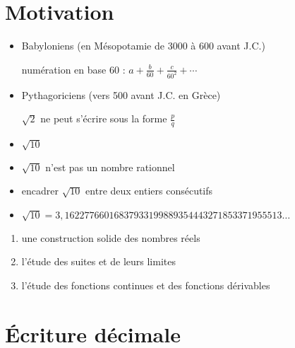 \section*{Motivation}
\begin{frame}


\begin{itemize}
 \item Babyloniens (en Mésopotamie de 3000 à 600 avant J.C.) 
\pause

 numération en base $60$ : $a+\frac{b}{60} + \frac{c}{60^2}+ \cdots$

 \pause
 
 \item Pythagoriciens (vers 500 avant J.C. en Grèce)

 \pause
 
 $\sqrt2$ ne peut s'écrire sous la forme $\frac pq$
 
  \pause
  
 \item $\sqrt{10}$
 
  \pause
  
 \item $\sqrt{10}$ n'est pas un nombre rationnel
 
  \pause
  
  \item encadrer $\sqrt{10}$ entre deux entiers consécutifs
 
  \pause
  
  \item $\sqrt{10} = 3,16227766016837933199889354443271853371955513\ldots$
\end{itemize}

 \pause
 
\begin{enumerate}
  \item une construction solide des nombres réels

  \item l'étude des suites et de leurs limites

  \item l'étude des fonctions continues et des fonctions dérivables
\end{enumerate}


\end{frame}



\section*{\'Ecriture décimale}

